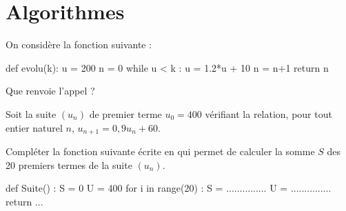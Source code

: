\documentclass[a4paper,11pt]{article}
\begin{document}
\pagebreak

\section{Algorithmes}

\begin{cexercice}
On considère la fonction \calgpython{} suivante :

\begin{envcodepythontex}[largeur=8cm,lignes,centre=true]
	def evolu(k):
		u = 200
		n = 0
		while u < k :
			u = 1.2*u + 10
			n = n+1
		return n
\end{envcodepythontex}

Que renvoie l'appel  ?
\end{cexercice}

\begin{cexercice}
Soit la suite $\left(u_n\right)$ de premier terme $u_0= 400$ vérifiant la relation, pour tout entier naturel $n$, $u_{n+1} = 0,9u_n +60$.

Compléter la fonction  suivante écrite en \calgpython{} qui permet de calculer la somme $S$ des 20 premiers termes de la suite $\left(u_n\right)$.

\begin{envcodepythontex}[largeur=8cm,lignes,centre=true]
	def Suite() :
		S = 0
		U = 400
		for i in range(20) :
			S = ...............
			U = ...............
		return ...
\end{envcodepythontex}
\end{cexercice}
\end{document}
